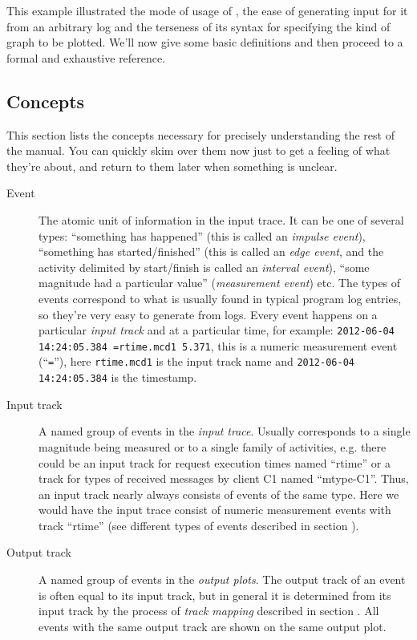 \documentclass{article}
\begin{document}
This example illustrated the mode of usage of \timeplot{}, the ease of generating input for it from an arbitrary log and the terseness of its syntax for specifying the kind of graph to be plotted. We'll now give some basic definitions and then proceed to a formal and exhaustive reference.

\subsection{Concepts}
\label{sec:tplot-concepts}

This section lists the concepts necessary for precisely understanding the rest of the manual. You can quickly skim over them now just to get a feeling of what they're about, and return to them later when something is unclear.

\begin{description}
\item[Event] The atomic unit of information in the input trace. It can be one of several types: ``something has happened'' (this is called an \emph{impulse event}), ``something has started/finished'' (this is called an \emph{edge event}, and the activity delimited by start/finish is called an \emph{interval event}), ``some magnitude had a particular value'' (\emph{measurement event}) etc. The types of events correspond to what is usually found in typical program log entries, so they're very easy to generate from logs. Every event happens on a particular \emph{input track} and at a particular time, for example: \verb|2012-06-04 14:24:05.384 =rtime.mcd1 5.371|, this is a numeric measurement event (``\texttt{=}''), here \verb|rtime.mcd1| is the input track name and \verb|2012-06-04 14:24:05.384| is the timestamp.
\item[Input track] A named group of events in the \emph{input trace}. Usually corresponds to a single magnitude being measured or to a single family of activities, e.g. there could be an input track for request execution times named ``rtime'' or a track for types of received messages by client C1 named ``mtype-C1''. Thus, an input track nearly always consists of events of the same type. Here we would have the input trace consist of numeric measurement events with track ``rtime'' (see different types of events described in section ).
\item[Output track] A named group of events in the \emph{output plots}. The output track of an event is often equal to its input track, but in general it is determined from its input track by the process of \emph{track mapping} described in section . All events with the same output track are shown on the same output plot.

\end{description}
\end{document}
